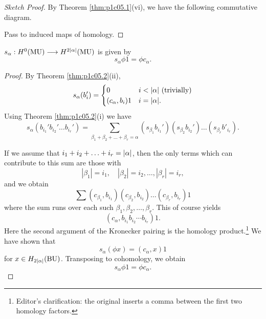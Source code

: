 \documentclass[../main]{subfiles}
\begin{document}
\begin{proof}[Sketch Proof]
By Theorem \ref{thm:p1c05.1}(vi), we have the following commutative diagram.

\begin{center}
\end{center}

Pass to induced maps of homology.
\end{proof} 

\begin{corollary}
\label{cor:p1c05.3}
$s_\alpha : H^0(\operatorname{MU}) \longrightarrow H^{2\lvert\alpha\rvert} (\operatorname{MU})$ is given by \[s_\alpha \phi 1 = \phi c_\alpha.\]
\end{corollary}

\begin{proof}
By Theorem \ref{thm:p1c05.2}(ii), \[s_\alpha(b_i') = \begin{cases}0 & i < \lvert\alpha\rvert \text { (trivially)} \\ (c_\alpha, b_i) 1 & i = \lvert\alpha\rvert.\end{cases}\] Using Theorem \ref{thm:p1c05.2}(i) we have \[s_\alpha (b_{i_1}' b_{i_2}' \ldots b_{i_r}') = \sum_{\beta_1 + \beta_2 + \ldots + \beta_r = \alpha} (s_{\beta_1} b_{i_1}') (s_{\beta_2} b_{i_2}') \ldots (s_{\beta_r} b'_{i_r}).\]

If we assume that $i_1 + i_2 + \ldots + i_r = \lvert\alpha\rvert$, then the only terms which can contribute to this sum are those with \[|\beta_1| = i_1, \quad |\beta_2| = i_2, \ldots, |\beta_r| = i_r,\] and we obtain \[\sum (c_{\beta_1}, b_{i_1}) (c_{\beta_2}, b_{i_2}) \ldots (c_{\beta_r}, b_{i_r}) 1\] where the sum runs over each such $\beta_1, \beta_2, \ldots, \beta_r$. This of course yields \[(c_\alpha, b_{i_1}b_{i_2}\cdots b_{i_r}) 1.\] Here the second argument of the Kronecker pairing is the homology product.\footnote{Editor's clarification: the original inserts a comma between the first two homology factors.} We have shown that \[s_\alpha(\phi x) = (c_\alpha, x) 1\] for $x \in H_{2\lvert\alpha\rvert} (\operatorname{BU})$. Transposing to cohomology, we obtain \[s_\alpha \phi 1 = \phi c_\alpha.\]
\end{proof}
\end{document}

